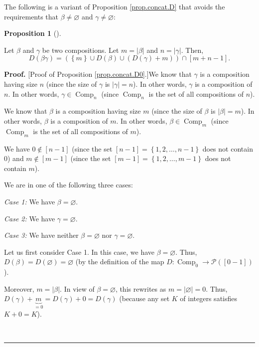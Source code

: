 \documentclass[numbers=enddot,12pt,final,onecolumn,notitlepage]{scrartcl}%
\theoremstyle{definition}
\newtheorem{prop}[theo]{Proposition}
\newenvironment{proposition}[1][]
{\begin{prop}[#1]\begin{leftbar}}
{\end{leftbar}\end{prop}}
\newenvironment{proof}[1][Proof]{\noindent\textbf{#1.} }{\ \rule{0.5em}{0.5em}}
\begin{document}
The following is a variant of Proposition \ref{prop.concat.D} that avoids the
requirements that $\beta\neq\varnothing$ and $\gamma\neq\varnothing$:

\begin{proposition}
\label{prop.concat.D0}Let $\beta$ and $\gamma$ be two compositions. Let
$m=\left\vert \beta\right\vert $ and $n=\left\vert \gamma\right\vert $. Then,
\[
D\left(  \beta\gamma\right)  =\left(  \left\{  m\right\}  \cup D\left(
\beta\right)  \cup\left(  D\left(  \gamma\right)  +m\right)  \right)
\cap\left[  m+n-1\right]  .
\]

\end{proposition}

\begin{proof}
[Proof of Proposition \ref{prop.concat.D0}.]We know that $\gamma$ is a
composition having size $n$ (since the size of $\gamma$ is $\left\vert
\gamma\right\vert =n$). In other words, $\gamma$ is a composition of $n$. In
other words, $\gamma\in\operatorname*{Comp}\nolimits_{n}$ (since
$\operatorname*{Comp}\nolimits_{n}$ is the set of all compositions of $n$).

We know that $\beta$ is a composition having size $m$ (since the size of
$\beta$ is $\left\vert \beta\right\vert =m$). In other words, $\beta$ is a
composition of $m$. In other words, $\beta\in\operatorname*{Comp}%
\nolimits_{m}$ (since $\operatorname*{Comp}\nolimits_{m}$ is the set of all
compositions of $m$).

We have $0\notin\left[  n-1\right]  $ (since the set $\left[  n-1\right]
=\left\{  1,2,\ldots,n-1\right\}  $ does not contain $0$) and $m\notin\left[
m-1\right]  $ (since the set $\left[  m-1\right]  =\left\{  1,2,\ldots
,m-1\right\}  $ does not contain $m$).

We are in one of the following three cases:

\textit{Case 1:} We have $\beta=\varnothing$.

\textit{Case 2:} We have $\gamma=\varnothing$.

\textit{Case 3:} We have neither $\beta=\varnothing$ nor $\gamma=\varnothing$.

Let us first consider Case 1. In this case, we have $\beta=\varnothing$. Thus,
$D\left(  \beta\right)  =D\left(  \varnothing\right)  =\varnothing$ (by the
definition of the map $D:\operatorname*{Comp}\nolimits_{0}\rightarrow
\mathcal{P}\left(  \left[  0-1\right]  \right)  $).

Moreover, $m=\left\vert \beta\right\vert $. In view of $\beta=\varnothing$,
this rewrites as $m=\left\vert \varnothing\right\vert =0$. Thus, $D\left(
\gamma\right)  +\underbrace{m}_{=0}=D\left(  \gamma\right)  +0=D\left(
\gamma\right)  $ (because any set $K$ of integers satisfies $K+0=K$).


\end{proof}
\end{document}
